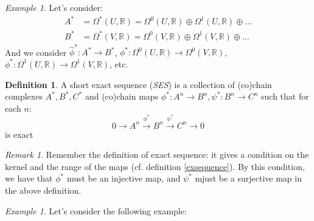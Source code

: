 \documentclass[a4paper,11pt,titlepage]{article}
\numberwithin{equation}{section}
\theoremstyle{definition}
\newtheorem{definition}[theorem]{Definition}
\theoremstyle{remark}
\newtheorem{remark}[theorem]{Remark}
\newtheorem{example}[theorem]{Example}
\newcommand{\rfield}{\mathbb{R}}
\begin{document}
\begin{example}
  Let's consider:
  \begin{align*}
    A^* &= \Omega^*(U, \rfield) = \Omega^0(U, \rfield) \oplus \Omega^1(U, \rfield) \oplus \ldots \\
    B^* &= \Omega^*(V, \rfield) = \Omega^0(V, \rfield) \oplus \Omega^1(V, \rfield) \oplus \ldots
  \end{align*}
  And we consider $\hat \phi^*\colon A^* \rightarrow B^*$, $\phi^* \colon \Omega^0(U, \rfield) \rightarrow \Omega^0(V, \rfield)$, $\phi^* \colon \Omega^1(U, \rfield) \rightarrow \Omega^1(V, \rfield)$, etc.
\end{example}

\begin{definition}
  A short exact sequence (\textit{SES}) is a collection of (co)chain complexes $A^*, B^*, C^*$ and (co)chain maps $\phi^* \colon A^n \rightarrow B^n, \psi^* \colon B^n \rightarrow C^n$ such that for each $n$:
  \begin{equation}
    0 \longrightarrow A^n \overset{\phi^*}{\longrightarrow} B^n \overset{\psi^*}{\longrightarrow} C^n \longrightarrow 0
  \end{equation}
  is exact
\end{definition}

\begin{remark}
  Remember the definition of exact sequence: it gives a condition on the kernel and the range of the maps (cf. definition \ref{exsequence}).
  By this condition, we have that $\phi^*$ must be an injective map, and $\psi^*$ mjust be a surjective map in the above definition.
\end{remark}

\begin{example}\label{seqexample}
  Let's consider the following example:\\
\end{example}
\end{document}
